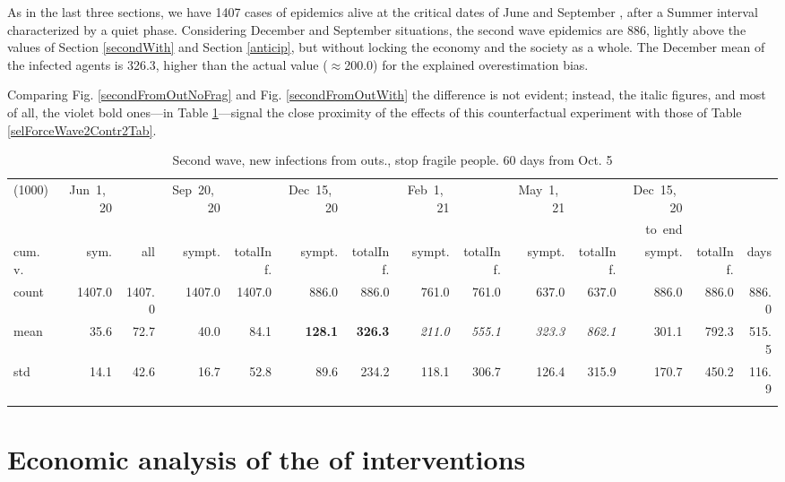 \documentclass[graybox]{svmult}
\begin{document}
As in the last three sections, we have 1407 cases of epidemics alive at the critical dates of June  and September , after a Summer interval characterized by a quiet phase.
Considering December  and September  situations, the second wave epidemics are 886, lightly above the values of Section \ref{secondWith} and Section \ref{anticip}, but without locking the economy and the society as a whole. The December mean of the infected agents is 326.3, higher than the actual value ($\approx$200.0) for the explained overestimation bias.

Comparing Fig. \ref{secondFromOutNoFrag} and Fig. \ref{secondFromOutWith} the difference is not evident; instead, the italic figures, and most of all, the violet bold ones---in Table \ref{selForceWave2NoFragTab}---signal the close proximity of the effects of this counterfactual experiment with those of Table \ref{selForceWave2Contr2Tab}.


\begin{table}[t]
\center
\tiny
\begin{tabular}{lrrrrrrrrrrrrr}
\hline\noalign{\smallskip}
(1000) & Jun~1,~20 & & Sep~20,~20 & & Dec~15,~20 & & Feb~1,~21 & & May~1,~21 & & Dec~15,~20 \\
& & & & & & & & & & & to~end \\
cum.~v. & sym. & all & sympt. & totalInf. & sympt. & totalInf. & sympt. & totalInf. & sympt. & totalInf. & sympt. & totalInf. & days\\
\noalign{\smallskip}\svhline\noalign{\smallskip}
count & 1407.0 & 1407.0 & 1407.0 & 1407.0 & 886.0 & 886.0 & 761.0 & 761.0 & 637.0 & 637.0 & 886.0 & 886.0 & 886.0 \\
mean & 35.6 & 72.7 & 40.0 & 84.1 & \textbf{{\color{violet}128.1}} & \textbf{{\color{violet}326.3}} & \emph{211.0} & \emph{555.1} & \emph{323.3} & \emph{862.1} & 301.1 & 792.3 & 515.5 \\
std & 14.1 & 42.6 & 16.7 & 52.8 & 89.6 & 234.2 & 118.1 & 306.7 & 126.4 & 315.9 & 170.7 & 450.2 & 116.9 \\
\hline\noalign{\smallskip}
\end{tabular}
\caption{Second wave, new infections from outs., stop fragile people. 60 days from Oct. 5}
\label{selForceWave2NoFragTab}
\end{table}

\section{Economic analysis of the of interventions}
\label{CBanalysis}
\end{document}
